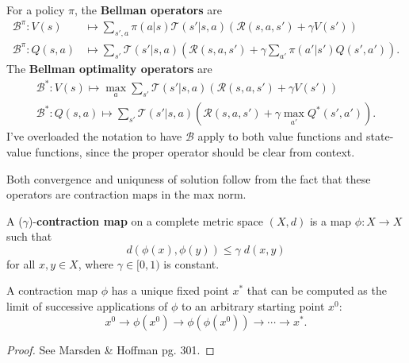 \documentclass[twoside,10pt]{report}
\begin{document}
\begin{defn}
	For a policy $\pi$, the \textbf{Bellman operators} are
	\begin{align*}
		\mathcal{B}^{\pi}: V(s) &\mapsto \sum_{s',a} \pi(a|s) \mathcal{T}(s'|s,a) \left( \mathcal{R}(s,a,s') + \gamma V(s') \right) \\
		\mathcal{B}^{\pi}: Q(s,a) &\mapsto \sum_{s'} \mathcal{T}(s'|s,a) \left( \mathcal{R}(s,a,s') + \gamma \sum_{a'} \pi(a'|s') Q(s',a') \right).
	\end{align*}
	The \textbf{Bellman optimality operators} are
	\begin{align*}
		\mathcal{B}^{*}: V(s) \mapsto \max_{a} \sum_{s'} \mathcal{T}(s'|s,a) \left( \mathcal{R}(s,a,s') + \gamma V(s') \right) \\
		\mathcal{B}^{*}: Q(s,a) \mapsto \sum_{s'} \mathcal{T}(s'|s,a) \left( \mathcal{R}(s,a,s') + \gamma \max_{a'}Q^{*}(s',a') \right).
	\end{align*}
	I've overloaded the notation to have $\mathcal{B}$ apply to both value functions and state-value functions, since the proper operator should be clear from context.
\end{defn}

Both convergence and uniquness of solution follow from the fact that these operators are contraction maps in the max norm.

\begin{defn}[]
A ($\gamma$)-\textbf{contraction map} on a complete metric space $(X,d)$ is a map $\phi:X\to X$ such that
\[
d(\phi(x), \phi(y)) \leq \gamma \; d(x,y)
\] for all $x,y \in X$, where $\gamma \in [0, 1)$ is constant.
\end{defn}

\begin{thrm}
	A contraction map $\phi$ has a unique fixed point $x^{*}$ that can be computed as the limit of successive applications of $\phi$ to an arbitrary starting point $x^{0}$:
	\[
	x^{0} \to \phi(x^{0}) \to \phi(\phi(x^{0})) \to \cdots \to x^{*}.
	\] 
\end{thrm}
\begin{proof}
	See Marsden \& Hoffman pg. 301.
\end{proof}
\end{document}
